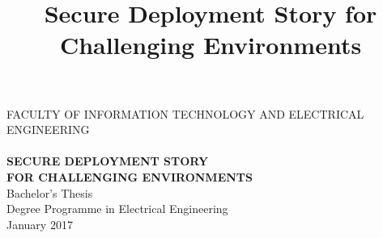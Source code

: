 \documentclass[a4paper,12pt,titlepage]{dithesis}
\title{Secure Deployment Story for Challenging Environments}
\begin{document}
\begin{titlepage}
	{{\small FACULTY OF INFORMATION TECHNOLOGY AND ELECTRICAL ENGINEERING}\\}
	\vspace{65 mm}
	{\textbf{\LARGE \getfirstname\ \getlastname}\\}
	\vspace{15 mm}
	{\textbf{\LARGE SECURE DEPLOYMENT STORY\\FOR CHALLENGING ENVIRONMENTS\\}}
	\vspace{70 mm}
	{\large {Bachelor's Thesis}\\}
	{\large {Degree Programme in Electrical Engineering}\\}
	{\large {January 2017}\\}
\end{titlepage}

\end{document}

